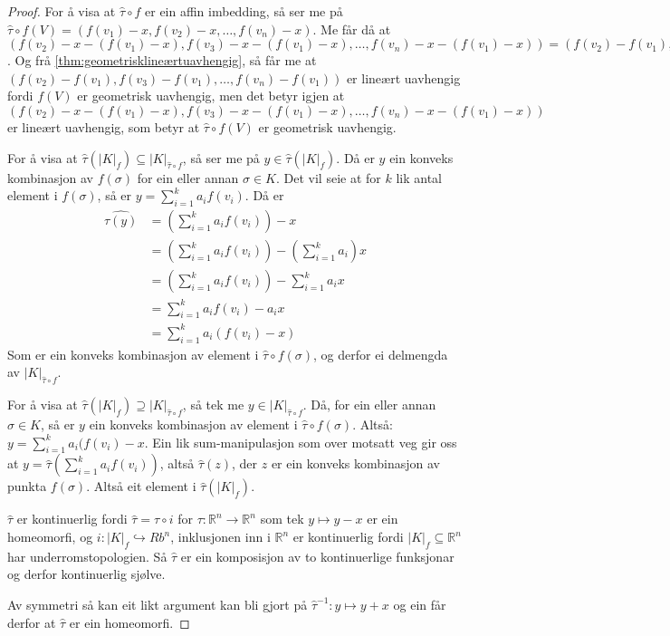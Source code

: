 \documentclass[a4paper, 12pt, norsk]{article}
\theoremstyle{plain}
\theoremstyle{definition}
\newcommand{\Rb}{\mathbb{R}}
\newcommand{\gr}[1]{ \lvert #1 \rvert } %
\begin{document}
\begin{proof} %
	For å visa at \( \hat{\tau} \circ f \) er ein affin imbedding, så ser me på \( \hat{\tau} \circ f(V) = (f(v_1)-x, f(v_2)-x, \dots, f(v_n)-x) \). Me får då at \( (f(v_2)-x-(f(v_1)-x), f(v_3)-x-(f(v_1)-x), \dots, f(v_n)-x-(f(v_1)-x)) = ( f(v_2)-f(v_1), f(v_3)-f(v_1), \dots, f(v_n)-f(v_1) ) \). Og frå \autoref{thm:geometrisklineærtuavhengig}, så får me at \( ( f(v_2)-f(v_1), f(v_3)-f(v_1), \dots, f(v_n)-f(v_1) ) \) er lineært uavhengig fordi \( f(V) \) er geometrisk uavhengig, men det betyr igjen at \( (f(v_2)-x-(f(v_1)-x), f(v_3)-x-(f(v_1)-x), \dots, f(v_n)-x-(f(v_1)-x)) \) er lineært uavhengig, som betyr at \( \hat{\tau} \circ f(V) \) er geometrisk uavhengig.

	For å visa at \( \hat{\tau}(\gr{K}_f) \subseteq \gr{K}_{\hat{\tau} \circ f} \), så ser me på \( y \in \hat{\tau}(\gr{K}_f) \). Då er \( y \) ein konveks kombinasjon av \( f(\sigma) \) for ein eller annan \( \sigma \in K \). Det vil seie at for \( k \) lik antal element i \( f(\sigma) \), så er \( y = \sum_{i=1}^k a_i f(v_i) \). Då er
	\begin{align*}
		\hat{\tau(y)} &= \left(\sum_{i=1}^k a_i f(v_i)\right) - x \\
		&= \left(\sum_{i=1}^k a_i f(v_i)\right)-\left(\sum_{i=1}^k a_i \right)x \\
		&= \left(\sum_{i=1}^k a_i f(v_i)\right)-\sum_{i=1}^k a_i x \\
		&= \sum_{i=1}^k a_i f(v_i) - a_i x \\
		&= \sum_{i=1}^k a_i(f(v_i) - x)
	\end{align*}
	Som er ein konveks kombinasjon av element i \( \hat{\tau} \circ f(\sigma) \), og derfor ei delmengda av \( \gr{K}_{\hat{\tau} \circ f} \).

	For å visa at \( \hat{\tau}(\gr{K}_f) \supseteq \gr{K}_{\hat{\tau} \circ f} \), så tek me \( y \in \gr{K}_{\hat{\tau} \circ f} \). Då, for ein eller annan \( \sigma \in K \), så er \( y \) ein konveks kombinasjon av element i \( \hat{\tau}\circ f(\sigma) \). Altså: \(  y = \sum_{i=1}^k a_i (f(v_i) - x \). Ein lik sum-manipulasjon som over motsatt veg gir oss at \( y = \hat{\tau}\left(\sum_{i=1}^k a_i f(v_i)\right) \), altså \( \hat{\tau}(z) \), der \( z \) er ein konveks kombinasjon av punkta \( f(\sigma) \). Altså eit element i \( \hat{\tau}(\gr{K}_f) \).

	\( \hat{\tau} \) er kontinuerlig fordi \( \hat{\tau} = \tau \circ i \) for \( \tau: \Rb^n \to \Rb^n \) som tek \( y \mapsto y-x \) er ein homeomorfi, og \( i: \gr{K}_f \hookrightarrow Rb^n \), inklusjonen inn i \( \Rb^n \) er kontinuerlig fordi \( \gr{K}_f \subseteq \Rb^n \) har underromstopologien. Så \( \hat{\tau} \) er ein komposisjon av to kontinuerlige funksjonar og derfor kontinuerlig sjølve.

	Av symmetri så kan eit likt argument kan bli gjort på \( \hat{\tau}^{-1}: y \mapsto y+x \) og ein får derfor at \( \hat{\tau} \) er ein homeomorfi.
\end{proof}
\end{document}
